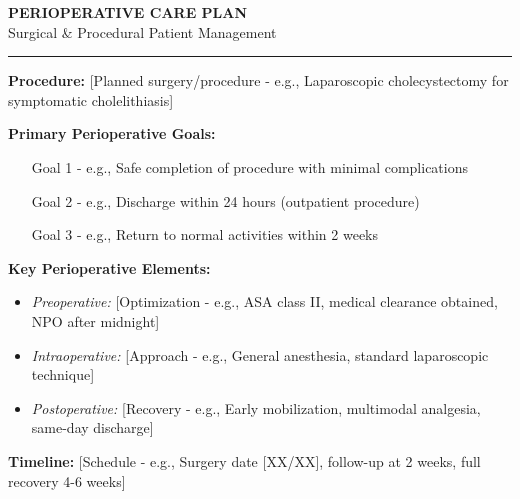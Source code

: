\documentclass[11pt,letterpaper]{article}
\begin{document}
\begin{center}
{\Large\bfseries PERIOPERATIVE CARE PLAN}\\[0.5em]
{\large Surgical \& Procedural Patient Management}\\[0.5em]
\rule{\textwidth}{1pt}
\end{center}

\vspace{1em}

\begin{tcolorbox}[colback=red!5!white,colframe=red!75!black,title=\textbf{TREATMENT PLAN HIGHLIGHTS},fonttitle=\bfseries\large]

\textbf{Procedure:} [Planned surgery/procedure - e.g., Laparoscopic cholecystectomy for symptomatic cholelithiasis]

\vspace{0.3em}
\textbf{Primary Perioperative Goals:}
\begin{itemize}[leftmargin=*,itemsep=0pt]
    \item [Goal 1 - e.g., Safe completion of procedure with minimal complications]
    \item [Goal 2 - e.g., Discharge within 24 hours (outpatient procedure)]
    \item [Goal 3 - e.g., Return to normal activities within 2 weeks]
\end{itemize}

\vspace{0.3em}
\textbf{Key Perioperative Elements:}
\begin{itemize}[leftmargin=*,itemsep=0pt]
    \item \textit{Preoperative:} [Optimization - e.g., ASA class II, medical clearance obtained, NPO after midnight]
    \item \textit{Intraoperative:} [Approach - e.g., General anesthesia, standard laparoscopic technique]
    \item \textit{Postoperative:} [Recovery - e.g., Early mobilization, multimodal analgesia, same-day discharge]
\end{itemize}

\vspace{0.3em}
\textbf{Timeline:} [Schedule - e.g., Surgery date [XX/XX], follow-up at 2 weeks, full recovery 4-6 weeks]

\end{tcolorbox}

\vspace{1em}
\end{document}
